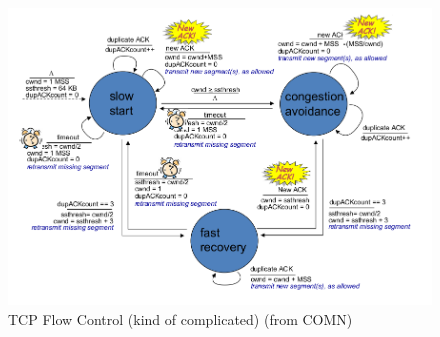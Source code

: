 \documentclass{article}
\begin{document}
\begin{figure}
    \centering
    \includegraphics[width=1\textwidth]{figures/flow_control.png}
    \caption{TCP Flow Control (kind of complicated) (from COMN)}
    \label{fig:tcp_flow_control}
\end{figure}
\end{document}
